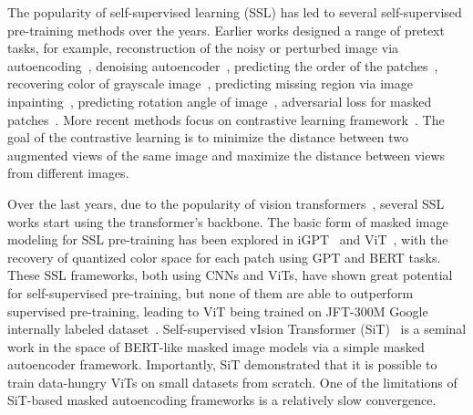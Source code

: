 \documentclass[10pt,journal,compsoc]{IEEEtran}
\begin{document}
The popularity of self-supervised learning (SSL) has led to several self-supervised pre-training methods over the years. Earlier works designed a range of pretext tasks, for example, reconstruction of the noisy or perturbed image via autoencoding~\cite{kramer1991nonlinear}, denoising autoencoder~\cite{vincent2008extracting}, predicting the order of the patches~\cite{noroozi2016unsupervised}, recovering color of grayscale image~\cite{zhang2016colorful}, predicting missing region via image inpainting~\cite{pathak2016context}, predicting rotation angle of image~\cite{gidaris2018unsupervised}, adversarial loss for masked patches~\cite{trinh2019selfie}. More recent methods focus on contrastive learning framework~\cite{oord2018representation,wu2018unsupervised,hjelm2018learning,bachman2019learning,
chen2020simple,NEURIPS2020_29539ed9,grill2020bootstrap}. The goal of the contrastive learning is to minimize the distance between two augmented views of the same image and maximize the distance between views from different images. 

Over the last years, due to the popularity of vision transformers~\cite{dosovitskiy2020image}, several SSL works start using the transformer's backbone. The basic form of masked image modeling for SSL pre-training has been explored in iGPT~\cite{chen2020generative} and ViT~\cite{dosovitskiy2020image}, with the recovery of quantized color space for each patch using GPT and BERT tasks. These SSL frameworks, both using CNNs and ViTs, have shown great potential for self-supervised pre-training, but none of them are able to outperform supervised pre-training, leading to ViT being trained on JFT-300M Google internally labeled dataset~\cite{dosovitskiy2020image}. Self-supervised vIsion Transformer (SiT)~\cite{atito2021sit} is a seminal work in the space of BERT-like masked image models via a simple masked autoencoder framework. Importantly, SiT demonstrated that it is possible to train data-hungry ViTs on small datasets from scratch. One of the limitations of SiT-based masked autoencoding frameworks is a relatively slow convergence. 
\end{document}
